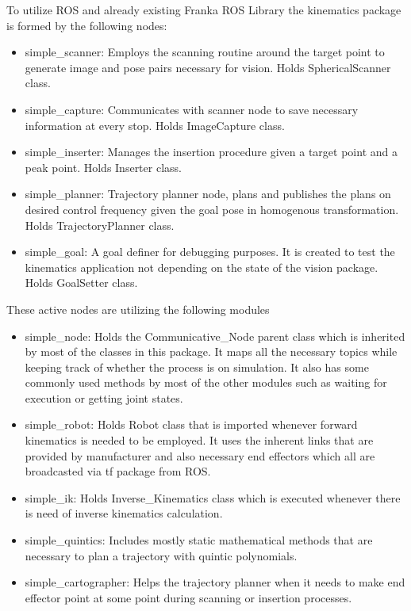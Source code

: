 To utilize ROS and already existing Franka ROS Library the kinematics package is formed by the following nodes:
\begin{itemize}
    \item simple\_scanner: Employs the scanning routine around the target point to generate image and pose pairs necessary for vision. Holds SphericalScanner class.
    \item simple\_capture: Communicates with scanner node to save necessary information at every stop. Holds ImageCapture class.
    \item simple\_inserter: Manages the insertion procedure given a target point and a peak point. Holds Inserter class.
    \item simple\_planner: Trajectory planner node, plans and publishes the plans on desired control frequency given the goal pose in homogenous transformation. Holds TrajectoryPlanner class.
    \item simple\_goal: A goal definer for debugging purposes. It is created to test the kinematics application not depending on the state of the vision package. Holds GoalSetter class.
\end{itemize}
These active nodes are utilizing the following modules
\begin{itemize}
    \item simple\_node: Holds the Communicative\_Node parent class which is inherited by most of the classes in this package. It maps all the necessary topics while keeping track of whether the process is on simulation. It also has some commonly used methods by most of the other modules such as waiting for execution or getting joint states.
    \item simple\_robot: Holds Robot class that is imported whenever forward kinematics is needed to be employed. It uses the inherent links that are provided by manufacturer and also necessary end effectors which all are broadcasted via tf package from ROS.
    \item simple\_ik: Holds Inverse\_Kinematics class which is executed whenever there is need of inverse kinematics calculation.
    \item simple\_quintics: Includes mostly static mathematical methods that are necessary to plan a trajectory with quintic polynomials.
    \item simple\_cartographer: Helps the trajectory planner when it needs to make end effector point at some point during scanning or insertion processes.
\end{itemize}

